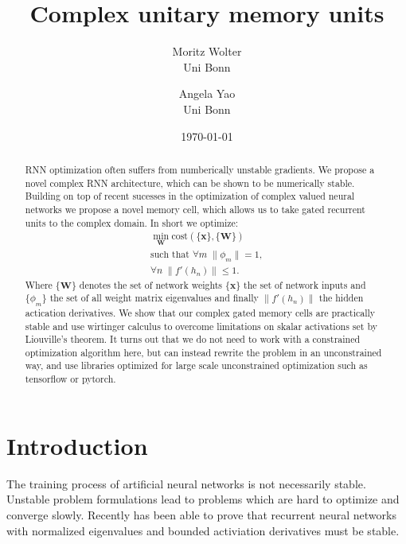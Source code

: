 \documentclass{article}
\title{Complex unitary memory units}
\author{Moritz Wolter  \\
    Uni Bonn  \\
    \and 
    Angela Yao \\
    Uni Bonn \\
    }
\date{\today}
\begin{document}
\tableofcontents
\newpage
\maketitle
\begin{abstract}
RNN optimization often suffers from numberically unstable gradients. We propose a novel complex RNN architecture, which can be shown to be numerically stable. Building on top of recent sucesses in the optimization of complex valued neural networks we propose a novel memory cell, which allows us to take gated recurrent units to the complex domain. In short we optimize: 
\begin{align}
\min_{\mathbf{W}} \text{cost}(\{\mathbf{x}\}, \{\mathbf{W}\}) \\
\text{such that } \forall m \; \| \phi_m \| = 1, \\
                  \forall n \; \| f'(h_n) \| \leq 1.
\end{align}
Where $\{\mathbf{W}\}$ denotes the set of network weights $\{\mathbf{x}\}$ the set of network inputs and $\{\phi_m\}$ the set of all weight matrix eigenvalues and finally $\|f'(h_n) \|$ the hidden actication derivatives.
We show that our complex gated memory cells are practically stable and use wirtinger calculus to overcome limitations on skalar activations set by Liouville's theorem. It turns out that we do not need to work with a constrained optimization algorithm here, but can instead rewrite the problem in an unconstrained way, and use libraries optimized for large scale unconstrained optimization such as tensorflow or pytorch.
\end{abstract}

\section{Introduction}
The training process of artificial neural networks is not necessarily stable. Unstable problem formulations lead to problems which are hard to optimize and converge slowly. Recently \cite{Arjovsky} has been able to prove that recurrent neural networks with normalized eigenvalues and bounded activiation derivatives must be stable. 
\end{document}
